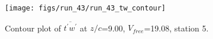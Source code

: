 \begin{figure}[H]
\centering
\texttt{[image: figs/run\_43/run\_43\_tw\_contour]}
\caption{Contour plot of $\overline{t^\prime w^\prime}$ at $z/c$=9.00, $V_{free}$=19.08, station 5.}
\label{fig:run_43_tw_contour}
\end{figure}


